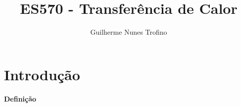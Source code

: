 \documentclass{article}
\title{ES570 - Transferência de Calor}
\author{Guilherme Nunes Trofino}
\begin{document}
    \maketitle
\newpage

    \tableofcontents
\newpage

    \section{Introdução}
        \paragraph{Definição}
\end{document}
